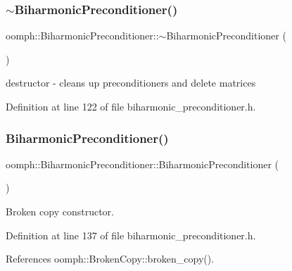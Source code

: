 \subsubsection{\texorpdfstring{$\sim$\+Biharmonic\+Preconditioner()}{~BiharmonicPreconditioner()}}
{\footnotesize\ttfamily oomph\+::\+Biharmonic\+Preconditioner\+::$\sim$\+Biharmonic\+Preconditioner (\begin{DoxyParamCaption}{ }\end{DoxyParamCaption})\hspace{0.3cm}{\ttfamily [inline]}}



destructor -\/ cleans up preconditioners and delete matrices 



Definition at line 122 of file biharmonic\+\_\+preconditioner.\+h.

\mbox{\label{classoomph_1_1BiharmonicPreconditioner_aa4890df601c3f22f610e74b4de368be3}} 
\subsubsection{\texorpdfstring{Biharmonic\+Preconditioner()}{BiharmonicPreconditioner()}\hspace{0.1cm}{\footnotesize\ttfamily [2/2]}}
{\footnotesize\ttfamily oomph\+::\+Biharmonic\+Preconditioner\+::\+Biharmonic\+Preconditioner (\begin{DoxyParamCaption}\item[{const \hyperlink{classoomph_1_1BiharmonicPreconditioner}{Biharmonic\+Preconditioner} \&}]{ }\end{DoxyParamCaption})\hspace{0.3cm}{\ttfamily [inline]}}



Broken copy constructor. 



Definition at line 137 of file biharmonic\+\_\+preconditioner.\+h.



References oomph\+::\+Broken\+Copy\+::broken\+\_\+copy().



